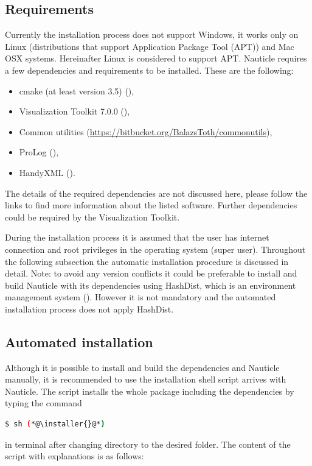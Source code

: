 \documentclass[a4paper,12pt,openany]{book}
\newcommand{\myhref}[3][nauticlegreen_dark]{\href{#2}{\color{#1}{#3}}}%
\theoremstyle{break}
\begin{document}
\subsection{Requirements}
Currently the installation process does not support Windows, it works only on Linux (distributions that support Application Package Tool (APT)) and Mac OSX systems. Hereinafter Linux is considered to support APT.
Nauticle requires a few dependencies and requirements to be installed. These are the following:
\begin{itemize}
  \item cmake (at least version 3.5) (\myhref{https://cmake.org/download/}{https://cmake.org/download/}),
  \item Visualization Toolkit 7.0.0 (\myhref{http://www.vtk.org/files/release/7.0/VTK-7.0.0.zip}{http://www.vtk.org/files/release/7.0/VTK-7.0.0.zip}),
  \item Common utilities (\href{https://bitbucket.org/BalazsToth/commonutils}{https://bitbucket.org/BalazsToth/commonutils}),
  \item ProLog (\myhref{https://bitbucket.org/BalazsToth/prolog}{https://bitbucket.org/BalazsToth/prolog}),
  \item HandyXML (\myhref{https://bitbucket.org/BalazsToth/handyxml}{https://bitbucket.org/BalazsToth/handyxml}).
\end{itemize}
The details of the required dependencies are not discussed here, please follow the links to find more information about the listed software. Further dependencies could be required by the Visualization Toolkit.

During the installation process it is assumed that the user has internet connection and root privileges in the operating system (super user). Throughout the following subsection the automatic installation procedure is discussed in detail.
Note: to avoid any version conflicts it could be preferable to install and build Nauticle with its dependencies using HashDist, which is an environment management system (\myhref{https://github.com/hashdist/hashdist}{https://github.com/hashdist/ hashdist}). However it is not mandatory and the automated installation process does not apply HashDist.
\subsection{Automated installation}
Although it is possible to install and build the dependencies and Nauticle manually, it is recommended to use the installation shell script arrives with Nauticle. The script installs the whole package including the dependencies by typing the command
\begin{lstlisting}[language=bash]
  $ sh (*@\installer{}@*)
\end{lstlisting}
in terminal after changing directory to the desired folder. The content of the script with explanations is as follows:
\end{document}

